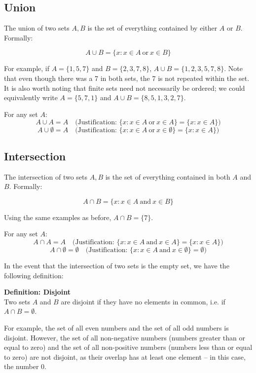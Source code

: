 \documentclass{article}
\begin{document}
\subsection*{Union}
The union of two sets $A, B$ is the set of everything contained by either $A$ or $B$. Formally:

\[
\boxed{A \cup B = \{x : x \in A \: \text{or} \: x \in B \}}
\]

For example, if $A = \{1, 5, 7\}$ and $B = \{2, 3, 7, 8\}$, $A \cup B = \{1, 2, 3, 5, 7, 8\}$. Note that even though there was a 7 in both sets, the 7 is not repeated within the set. It is also worth noting that finite sets need not necessarily be ordered; we could equivalently write $A = \{5, 7, 1\}$ and $A \cup B = \{8, 5, 1, 3, 2, 7 \}$.

For any set $A$:
\[
A \cup A = A \quad \text{(Justification: $\{x : x \in A \: \text{or} \: x \in A\} = \{x : x \in A \}$)}
\]
\[
A \cup \emptyset = A \quad \text{(Justification: $\{x : x \in A \: \text{or} \: x \in \emptyset\} = \{x : x \in A \}$)}
\]

\subsection*{Intersection}
The intersection of two sets $A, B$ is the set of everything contained in both $A$ and $B$. Formally:

\[
\boxed{A \cap B = \{x : x \in A \: \text{and} \: x \in B \}}
\]

Using the same examples as before, $A \cap B = \{7 \}$.

For any set $A$:
\[
A \cap A = A \quad \text{(Justification: $\{x : x \in A \: \text{and} \: x \in A\} = \{x : x \in A \}$)}
\]
\[
A \cap \emptyset = \emptyset \quad \text{(Justification: $\{x : x \in A \: \text{and} \: x \in \emptyset\} = \emptyset$)}
\]

In the event that the intersection of two sets is the empty set, we have the following definition:

\textbf{Definition: Disjoint} \\
Two sets $A$ and $B$ are disjoint if they have no elements in common, i.e. if $A \cap B = \emptyset$.

For example, the set of all even numbers and the set of all odd numbers is disjoint. However, the set of all non-negative numbers (numbers greater than or equal to zero) and the set of all non-positive numbers (numbers less than or equal to zero) are not disjoint, as their overlap has at least one element -- in this case, the number 0.
\end{document}

